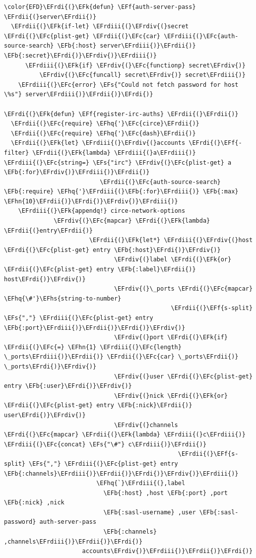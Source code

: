 \documentclass{scrartcl}
\newcommand{\EFk}[1]{\textcolor{EFk}{#1}} %
\newcommand{\EFs}[1]{\textcolor{EFs}{#1}} %
\newcommand{\EFb}[1]{\textcolor{EFb}{#1}} %
\newcommand{\EFc}[1]{\textcolor{EFc}{#1}} %
\newcommand{\EFf}[1]{\textcolor{EFf}{#1}} %
\newcommand{\EFhn}[1]{#1} %
\newcommand{\EFhq}[1]{#1} %
\newcommand{\EFhs}[1]{#1} %
\newcommand{\EFrdi}[1]{#1} %
\newcommand{\EFrdii}[1]{#1} %
\newcommand{\EFrdiii}[1]{#1} %
\newcommand{\EFrdiv}[1]{#1} %
\begin{document}
\begin{Code}
\begin{Verbatim}[]
\color{EFD}\EFrdi{(}\EFk{defun} \EFf{auth-server-pass} \EFrdii{(}server\EFrdii{)}
  \EFrdii{(}\EFk{if-let} \EFrdiii{(}\EFrdiv{(}secret \EFrdi{(}\EFc{plist-get} \EFrdii{(}\EFc{car} \EFrdiii{(}\EFc{auth-source-search} \EFb{:host} server\EFrdiii{)}\EFrdii{)} \EFb{:secret}\EFrdi{)}\EFrdiv{)}\EFrdiii{)}
      \EFrdiii{(}\EFk{if} \EFrdiv{(}\EFc{functionp} secret\EFrdiv{)}
          \EFrdiv{(}\EFc{funcall} secret\EFrdiv{)} secret\EFrdiii{)}
    \EFrdiii{(}\EFc{error} \EFs{"Could not fetch password for host \%s"} server\EFrdiii{)}\EFrdii{)}\EFrdi{)}

\EFrdi{(}\EFk{defun} \EFf{register-irc-auths} \EFrdii{(}\EFrdii{)}
  \EFrdii{(}\EFc{require} \EFhq{'}\EFc{circe}\EFrdii{)}
  \EFrdii{(}\EFc{require} \EFhq{'}\EFc{dash}\EFrdii{)}
  \EFrdii{(}\EFk{let} \EFrdiii{(}\EFrdiv{(}accounts \EFrdi{(}\EFf{-filter} \EFrdii{(}\EFk{lambda} \EFrdiii{(}a\EFrdiii{)} \EFrdiii{(}\EFc{string=} \EFs{"irc"} \EFrdiv{(}\EFc{plist-get} a \EFb{:for}\EFrdiv{)}\EFrdiii{)}\EFrdii{)}
                           \EFrdii{(}\EFc{auth-source-search} \EFb{:require} \EFhq{'}\EFrdiii{(}\EFb{:for}\EFrdiii{)} \EFb{:max} \EFhn{10}\EFrdii{)}\EFrdi{)}\EFrdiv{)}\EFrdiii{)}
    \EFrdiii{(}\EFk{appendq!} circe-network-options
              \EFrdiv{(}\EFc{mapcar} \EFrdi{(}\EFk{lambda} \EFrdii{(}entry\EFrdii{)}
                        \EFrdii{(}\EFk{let*} \EFrdiii{(}\EFrdiv{(}host \EFrdi{(}\EFc{plist-get} entry \EFb{:host}\EFrdi{)}\EFrdiv{)}
                               \EFrdiv{(}label \EFrdi{(}\EFk{or} \EFrdii{(}\EFc{plist-get} entry \EFb{:label}\EFrdii{)} host\EFrdi{)}\EFrdiv{)}
                               \EFrdiv{(}\_ports \EFrdi{(}\EFc{mapcar} \EFhq{\#'}\EFhs{string-to-number}
                                               \EFrdii{(}\EFf{s-split} \EFs{","} \EFrdiii{(}\EFc{plist-get} entry \EFb{:port}\EFrdiii{)}\EFrdii{)}\EFrdi{)}\EFrdiv{)}
                               \EFrdiv{(}port \EFrdi{(}\EFk{if} \EFrdii{(}\EFc{=} \EFhn{1} \EFrdiii{(}\EFc{length} \_ports\EFrdiii{)}\EFrdii{)} \EFrdii{(}\EFc{car} \_ports\EFrdii{)} \_ports\EFrdi{)}\EFrdiv{)}
                               \EFrdiv{(}user \EFrdi{(}\EFc{plist-get} entry \EFb{:user}\EFrdi{)}\EFrdiv{)}
                               \EFrdiv{(}nick \EFrdi{(}\EFk{or} \EFrdii{(}\EFc{plist-get} entry \EFb{:nick}\EFrdii{)} user\EFrdi{)}\EFrdiv{)}
                               \EFrdiv{(}channels \EFrdi{(}\EFc{mapcar} \EFrdii{(}\EFk{lambda} \EFrdiii{(}c\EFrdiii{)} \EFrdiii{(}\EFc{concat} \EFs{"\#"} c\EFrdiii{)}\EFrdii{)}
                                                 \EFrdii{(}\EFf{s-split} \EFs{","} \EFrdiii{(}\EFc{plist-get} entry \EFb{:channels}\EFrdiii{)}\EFrdii{)}\EFrdi{)}\EFrdiv{)}\EFrdiii{)}
                          \EFhq{`}\EFrdiii{(},label
                            \EFb{:host} ,host \EFb{:port} ,port \EFb{:nick} ,nick
                            \EFb{:sasl-username} ,user \EFb{:sasl-password} auth-server-pass
                            \EFb{:channels} ,channels\EFrdiii{)}\EFrdii{)}\EFrdi{)}
                      accounts\EFrdiv{)}\EFrdiii{)}\EFrdii{)}\EFrdi{)}
\end{Verbatim}
\end{Code}
\end{document}
